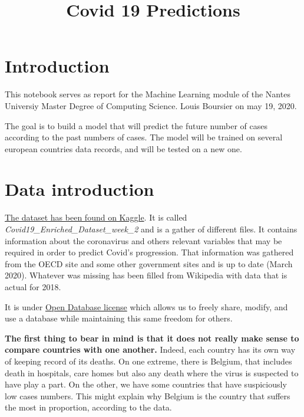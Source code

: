 \documentclass[11pt]{article}
\title{Covid 19 Predictions}
\begin{document}
    
    
    \maketitle
    
    

    
    \hypertarget{introduction}{%
\section{Introduction}\label{introduction}}

This notebook serves as report for the Machine Learning module of the
Nantes Universiy Master Degree of Computing Science. Louis Boursier on
may 19, 2020.

The goal is to build a model that will predict the future number of
cases according to the past numbers of cases. The model will be trained
on several european countries data records, and will be tested on a new
one.

\hypertarget{data-introduction}{%
\section{Data introduction}\label{data-introduction}}

\href{https://www.kaggle.com/optimo/covid19-enriched-dataset-week-2}{The
dataset has been found on Kaggle}. It is called
\emph{Covid19\_Enriched\_Dataset\_week\_2} and is a gather of different
files. It contains information about the coronavirus and others relevant
variables that may be required in order to predict Covid's progression.
That information was gathered from the OECD site and some other
government sites and is up to date (March 2020). Whatever was missing
has been filled from Wikipedia with data that is actual for 2018.

It is under \href{https://opendatacommons.org/licenses/dbcl/1.0/}{Open
Database license} which allows us to freely share, modify, and use a
database while maintaining this same freedom for others.

\textbf{The first thing to bear in mind is that it does not really make
sense to compare countries with one another.} Indeed, each country has
its own way of keeping record of its deaths. On one extreme, there is
Belgium, that includes death in hospitals, care homes but also any death
where the virus is suspected to have play a part. On the other, we have
some countries that have suspiciously low cases numbers. This might
explain why Belgium is the country that suffers the most in proportion,
according to the data.
\end{document}
